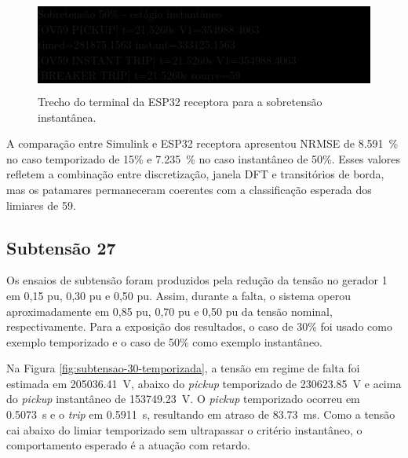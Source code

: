 \begin{figure}[H]
  \centering
  \caption{Trecho do terminal da ESP32 receptora para a sobretensão instantânea.}
  \label{fig:log-sobretensao-59i}
  \begingroup
  \setlength{\fboxsep}{6pt}
  \colorbox{black}{%
    \begin{minipage}{0.90\textwidth}
      \color{white}\scriptsize\ttfamily
      Sobretensão 50\% - estágio instantâneo\\
      {[OV59 PICKUP]} t=21.5260s V1=354988.4063\\
      \hspace*{1.8em}timed=281875.1563 instant=333125.1563\\
      {[OV59 INSTANT TRIP]} t=21.5260s V1=354988.4063\\
      {[BREAKER TRIP]} t=21.5260s source=59
    \end{minipage}
  }
  \endgroup
\end{figure}

A comparação entre Simulink e ESP32 receptora apresentou NRMSE de \SI{8,591}{\percent} no caso temporizado de 15\% e \SI{7,235}{\percent} no caso instantâneo de 50\%. Esses valores refletem a combinação entre discretização, janela DFT e transitórios de borda, mas os patamares permaneceram coerentes com a classificação esperada dos limiares de 59.

\subsection{Subtensão 27}

Os ensaios de subtensão foram produzidos pela redução da tensão no gerador 1 em 0,15 pu, 0,30 pu e 0,50 pu. Assim, durante a falta, o sistema operou aproximadamente em 0,85 pu, 0,70 pu e 0,50 pu da tensão nominal, respectivamente. Para a exposição dos resultados, o caso de 30\% foi usado como exemplo temporizado e o caso de 50\% como exemplo instantâneo.

Na Figura \ref{fig:subtensao-30-temporizada}, a tensão em regime de falta foi estimada em \SI{205036,41}{\volt}, abaixo do \textit{pickup} temporizado de \SI{230623,85}{\volt} e acima do \textit{pickup} instantâneo de \SI{153749,23}{\volt}. O \textit{pickup} temporizado ocorreu em \SI{0,5073}{\second} e o \textit{trip} em \SI{0,5911}{\second}, resultando em atraso de \SI{83,73}{\milli\second}. Como a tensão cai abaixo do limiar temporizado sem ultrapassar o critério instantâneo, o comportamento esperado é a atuação com retardo.

